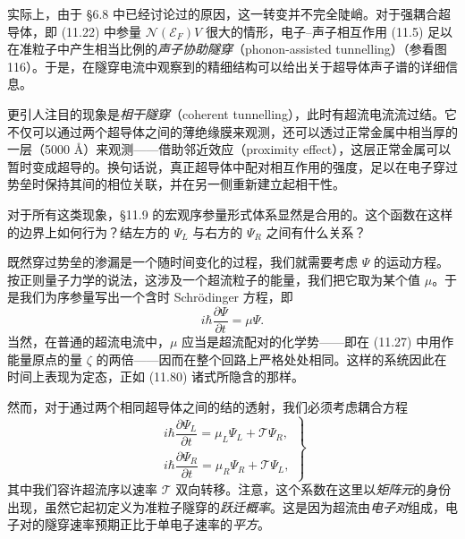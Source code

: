 
实际上，由于 §6.8 中已经讨论过的原因，这一转变并不完全陡峭。对于强耦合超导体，即 (11.22) 中参量 $\mathcal{N}(\mathcal{E}_F)V$ 很大的情形，电子–声子相互作用 (11.5) 足以在准粒子中产生相当比例的\emph{声子协助隧穿}（phonon-assisted tunnelling）（参看图 116）。于是，在隧穿电流中观察到的精细结构可以给出关于超导体声子谱的详细信息。

更引人注目的现象是\emph{相干隧穿}（coherent tunnelling），此时有超流电流流过结。它不仅可以通过两个超导体之间的薄绝缘膜来观测，还可以透过正常金属中相当厚的一层（5000 Å）来观测——借助邻近效应（proximity effect），这层正常金属可以暂时变成超导的。换句话说，真正超导体中配对相互作用的强度，足以在电子穿过势垒时保持其间的相位关联，并在另一侧重新建立起相干性。

对于所有这类现象，§11.9 的宏观序参量形式体系显然是合用的。这个函数在这样的边界上如何行为？结左方的 $\Psi_L$ 与右方的 $\Psi_R$ 之间有什么关系？

既然穿过势垒的渗漏是一个随时间变化的过程，我们就需要考虑 $\Psi$ 的运动方程。按正则量子力学的说法，这涉及一个超流粒子的能量，我们把它取为某个值 $\mu$。于是我们为序参量写出一个含时 Schrödinger 方程，即
\begin{equation*}
i\hbar\frac{\partial\Psi}{\partial t} = \mu\Psi.
\tag{11.87}
\end{equation*}
当然，在普通的超流电流中，$\mu$ 应当是超流配对的化学势——即在 (11.27) 中用作能量原点的量 $\zeta$ 的两倍——因而在整个回路上严格处处相同。这样的系统因此在时间上表现为定态，正如 (11.80) 诸式所隐含的那样。

然而，对于通过两个相同超导体之间的结的透射，我们必须考虑耦合方程
\begin{equation*}
\left.\begin{array}{l}
i\hbar\dfrac{\partial\Psi_L}{\partial t} = \mu_L\Psi_L + \mathcal{T}\Psi_R,\\[8pt]
i\hbar\dfrac{\partial\Psi_R}{\partial t} = \mu_R\Psi_R + \mathcal{T}\Psi_L,
\end{array}\right\}
\tag{11.88}
\end{equation*}
其中我们容许超流序以速率 $\mathcal{T}$ 双向转移。注意，这个系数在这里以\emph{矩阵元}的身份出现，虽然它起初定义为准粒子隧穿的\emph{跃迁概率}。这是因为超流由\emph{电子对}组成，电子对的隧穿速率预期正比于单电子速率的\emph{平方}。

